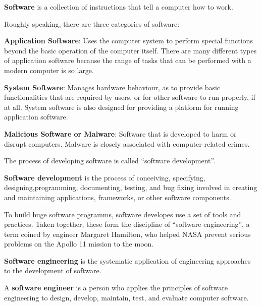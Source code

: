 \bd[Software]
\textbf{Software} is a collection of instructions that tell a computer how to work.
\ed

Roughly speaking, there are three categories of software:
\bit
\item \textbf{Application Software}: Uses the computer system to perform special functions beyond the basic operation of
the computer itself. There are many different types of application software because the range of tasks that can be
performed with a modern computer is so large.
\item \textbf{System Software}: Manages hardware behaviour, as to provide basic functionalities that are required by
users, or for other software to run properly, if at all. System software is also designed for providing a platform for
running application software.
\item \textbf{Malicious Software or Malware}: Software that is developed to harm or disrupt computers. Malware is
closely associated with computer-related crimes.
\eit

The process of developing software is called ``software development''.

\textbf{Software development} is the process of conceiving, specifying, designing,programming, documenting, testing,
and bug fixing involved in creating and maintaining applications, frameworks, or other software components.
\ed

To build huge software programms, software developes use a set of tools and practices. Taken together, these form the
discipline of ``software engineering'', a term coined by engineer Margaret Hamilton, who helped NASA prevent serious
problems on the Apollo 11 mission to the moon.

\textbf{Software engineering} is the systematic application of engineering approaches to the development of software.
\ed

A \textbf{software engineer} is a person who applies the principles of software engineering to design, develop,
maintain, test, and evaluate computer software.
\ed